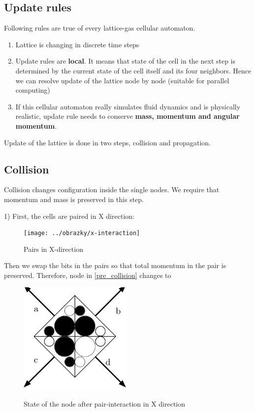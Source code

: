 \subsection{Update rules}
Following rules are true of every lattice-gas cellular automaton.

\begin{enumerate}
\item Lattice is changing in discrete time steps
\item Update rules are \textbf{local}. It means that state of the cell in the next step is determined by the current state of the cell itself and its four neighbors. Hence we can resolve update of the lattice node by node (suitable for parallel computing)
\item If this cellular automaton really simulates fluid dynamics and is physically realistic, update rule needs to conserve \textbf{mass, momentum and angular momentum}.
\end{enumerate}

Update of the lattice is done in two steps, collision and propagation.


\subsection{Collision}
Collision changes configuration inside the single nodes. We require that momentum and mass is preserved in this step.

1) First, the cells are paired in X direction:
\begin{figure}[htbp]
 \centering 
 \texttt{[image: ../obrazky/x-interaction]}
 \label{xinter}
 \caption{Pairs in X-direction}
\end{figure}

Then we swap the bits in the pairs so that total momentum in the pair is preserved. Therefore, node in \ref{pre_collision} changes to

\begin{figure}[H]
 \centering 
 \includegraphics[width=0.5\textwidth]{./img/node_2}
 \label{colision1}
 \caption{State of the node after pair-interaction in X direction}
\end{figure}

